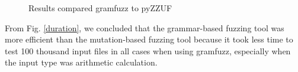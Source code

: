 \documentclass[11pt,a4paper]{article}
\begin{document}
\begin{figure}[H]
    \centering   
    \label{result-comp}

    \caption{Results compared {\cc gramfuzz} to {\cc pyZZUF}}    
\end{figure}
From Fig. \ref{duration}, we concluded that the grammar-based fuzzing tool was more efficient than the mutation-based fuzzing tool because it took less time to test 100 thousand input files in all cases when using {\cc gramfuzz}, especially when the input type was arithmetic calculation.
\end{document}
